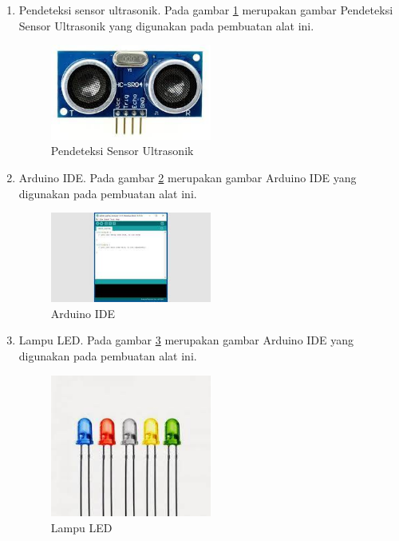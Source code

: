 \begin{enumerate}
\item Pendeteksi sensor ultrasonik. Pada gambar \ref{labelgambar4} merupakan gambar Pendeteksi Sensor Ultrasonik yang digunakan pada pembuatan alat ini.
	\begin{figure}[htbp]
	\centering
	\includegraphics[width=0.5\textwidth]{figures/ALAT_PENDETEKSI_BANJIR/pendeteksi_sensor_ultrasonik_1c}
	\caption{Pendeteksi Sensor Ultrasonik}
	\label{labelgambar4}
	\end{figure}

\item Arduino IDE.  Pada gambar \ref{labelgambar5} merupakan gambar Arduino IDE yang digunakan pada pembuatan alat ini.
	\begin{figure}[htbp]
	\centering
	\includegraphics[width=0.5\textwidth]{figures/ALAT_PENDETEKSI_BANJIR/arduino_IDE_1c}
	\caption{Arduino IDE}
	\label{labelgambar5}
	\end{figure}

\item Lampu LED.  Pada gambar \ref{labelgambar6} merupakan gambar Arduino IDE yang digunakan pada pembuatan alat ini.
	\begin{figure}[htbp]
	\centering
	\includegraphics[width=0.5\textwidth]{figures/ALAT_PENDETEKSI_BANJIR/lampu_led_1c}
	\caption{Lampu LED}
	\label{labelgambar6}
	\end{figure}
\end{enumerate}

